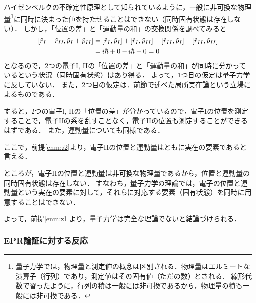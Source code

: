 \documentclass[uplatex,dvipdfmx,10pt,b5paper,papersize]{jsbook}
\begin{document}
ハイゼンベルクの不確定性原理として知られているように，一般に非可換な物理量\footnote{
  量子力学では，物理量と測定値の概念は区別される．物理量はエルミートな演算子（行列）であり，測定値はその固有値（ただの数）とされる．
  線形代数で習ったように，行列の積は一般には非可換であるから，物理量の積も一般には非可換である．
}に同時に決まった値を持たせることはできない（同時固有状態は存在しない）．
しかし，「位置の差」と「運動量の和」の交換関係を調べてみると
\begin{align*}
  \comm{\hat r_I - \hat r_{II}}{\hat p_I + \hat p_{II}}
  &= \comm{\hat r_I}{\hat p_I} + \comm{\hat r_I}{\hat p_{II}} - \comm{\hat r_{II}}{\hat p_I} - \comm{\hat r_{II}}{\hat p_{II}} \\
  &= i\hbar + 0 - i\hbar - 0
  = 0
\end{align*}
となるので，2つの電子I, IIの「位置の差」と「運動量の和」が同時に分かっているという状況（同時固有状態）はあり得る．
よって，1つ目の仮定は量子力学に反していない．
また，2つ目の仮定は，前節で述べた局所実在論という立場によるものである．\par
すると，2つの電子I, IIの「位置の差」が分かっているので，電子Iの位置を測定することで，電子IIの系を乱すことなく，電子IIの位置も測定することができるはずである．
また，運動量についても同様である．\par
ここで，前提\ref{enm:z2}より，電子IIの位置と運動量はともに実在の要素であると言える．\par
ところが，電子IIの位置と運動量は非可換な物理量であるから，位置と運動量の同時固有状態は存在しない．
すなわち，量子力学の理論では，電子の位置と運動量という実在の要素に対して，それらに対応する要素（固有状態）を同時に用意することはできない．\par
よって，前提\ref{enm:z1}より，量子力学は完全な理論でないと結論づけられる．

%
\subsubsection{EPR論証に対する反応} %
\end{document}
